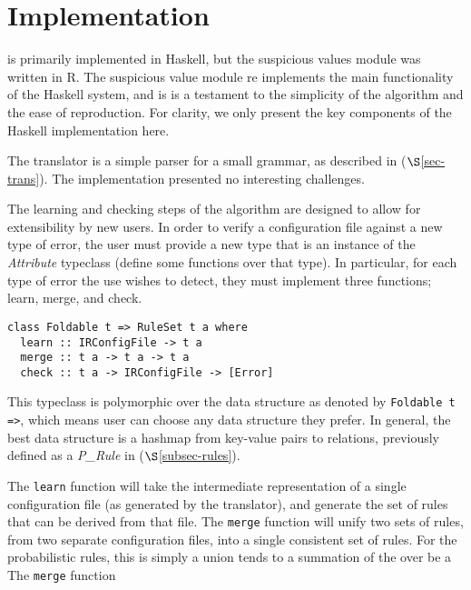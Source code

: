 \section{Implementation}



\app is primarily implemented in Haskell, but the suspicious values module was written in R. The suspicious value module re implements the main functionality of the Haskell system, and is is a testament to the simplicity of the algorithm and the ease of reproduction. For clarity, we only present the key components of the Haskell implementation here.

The translator is a simple parser for a small grammar, as described in ($\S$\ref{sec-trans}). The implementation presented no interesting challenges. 

The learning and checking steps of the algorithm are designed to allow for extensibility by new users. In order to verify a configuration file against a new type of error, the user must provide a new type that is an instance of the \textit{Attribute} typeclass (\ie define some functions over that type). In particular, for each type of error the use wishes to detect, they must implement three functions; learn, merge, and check. 


\begin{lstlisting}
class Foldable t => RuleSet t a where
  learn :: IRConfigFile -> t a
  merge :: t a -> t a -> t a
  check :: t a -> IRConfigFile -> [Error]
\end{lstlisting}

This typeclass is polymorphic over the data structure as denoted by \lstinline{Foldable t =>}, which means user can choose any data structure they prefer.
In general, the best data structure is a hashmap from key-value pairs to relations, previously defined as a \textit{P\_Rule} in ($\S$\ref{subsec-rules}).

The \lstinline{learn} function will take the intermediate representation of a single configuration file (as generated by the translator), and generate the set of rules that can be derived from that file.
The \lstinline{merge} function will unify two sets of rules, from two separate configuration files, into a single consistent set of rules. For the probabilistic rules, this is simply a union tends to a summation of the  over be a 
The \lstinline{merge} function

